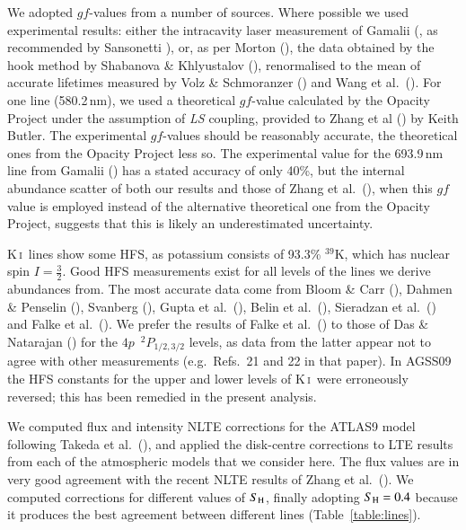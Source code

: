 \documentclass[traditabstract]{aa}
\newcommand{\altki}{K\,\textsc{i}}
\newcommand{\ki}{\altki\ }
\begin{document}
We adopted $gf$-values from a number of sources.  Where possible we used experimental results: either the intracavity laser measurement of Gamalii (\cite{Gamalii97}, as recommended by Sansonetti \cite{Sansonetti08}), or, as per Morton (\cite{Morton03}), the data obtained by the hook method by Shabanova \& Khlyustalov (\cite{Shabanova85}), renormalised to the mean of accurate lifetimes measured by Volz \& Schmoranzer (\cite{Volz96}) and Wang et al.\ (\cite{Wang97}).  For one line (580.2\,nm), we used a theoretical $gf$-value calculated by the Opacity Project under the assumption of \textit{LS} coupling, provided to Zhang et al (\cite{zhan}) by Keith Butler.  The experimental $gf$-values should be reasonably accurate, the theoretical ones from the Opacity Project less so.  The experimental value for the 693.9\,nm line from Gamalii (\cite{Gamalii97}) has a stated accuracy of only 40\%, but the internal abundance scatter of both our results and those of Zhang et al.\ (\cite{zhan}), when this $gf$ value is employed instead of the alternative theoretical one from the Opacity Project, suggests that this is likely an underestimated uncertainty.

\ki lines show some HFS, as potassium consists of 93.3\% $^{39}$K, which has nuclear spin $I=\frac32$.  Good HFS measurements exist for all levels of the lines we derive abundances from.  The most accurate data come from Bloom \& Carr (\cite{Bloom60}), Dahmen \& Penselin (\cite{Dahmen67}), Svanberg (\cite{Svanberg71}), Gupta et al.\ (\cite{Gupta73}), Belin et al.\ (\cite{Belin75}), Sieradzan et al.\ (\cite{Sieradzan97}) and Falke et al.\ (\cite{Falke06}).  We prefer the results of Falke et al.\ (\cite{Falke06}) to those of Das \& Natarajan (\cite{Das08}) for the $4p$\ $^2P_{1/2,3/2}$ levels, as data from the latter appear not to agree with other measurements (e.g.\ Refs.\ 21 and 22 in that paper).  In AGSS09 the HFS constants for the upper and lower levels of \ki were erroneously reversed; this has been remedied in the present analysis.

We computed flux and intensity NLTE corrections for the ATLAS9 model following Takeda et al.\ (\cite{tak2}), and applied the disk-centre corrections to LTE results from each of the atmospheric models that we consider here. The flux values are in very good agreement with the recent NLTE results of Zhang et al.\ (\cite{zhan}). We computed corrections for different values of $S_{\rm H}$, finally adopting $S_{\rm H}=0.4$ because it produces the best agreement between different lines (Table~\ref{table:lines}).
\end{document}
